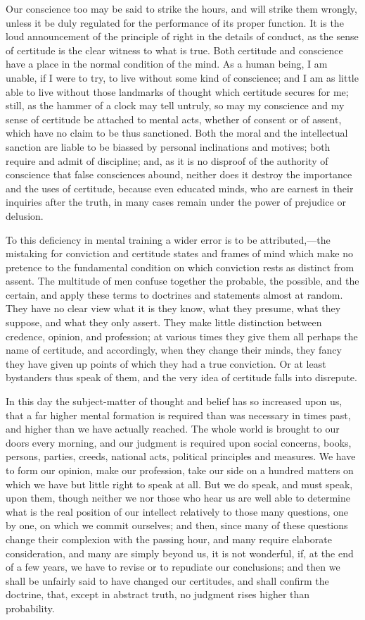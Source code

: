 Our conscience too may be said to strike the hours, and will strike
them wrongly, unless it be duly regulated for the performance of its
proper function. It is the loud announcement of the principle of right
in the details of conduct, as the sense of certitude is the clear
witness to what is true. Both certitude and conscience have a
place in the normal condition of the mind. As a human being, I am
unable, if I were to try, to live without some kind of conscience; and
I am as little able to live without those landmarks of thought which
certitude secures for me; still, as the hammer of a clock may tell
untruly, so may my conscience and my sense of certitude be attached to
mental acts, whether of consent or of assent, which have no claim to
be thus sanctioned. Both the moral and the intellectual sanction are
liable to be biassed by personal inclinations and motives; both
require and admit of discipline; and, as it is no disproof of the
authority of conscience that false consciences abound, neither does it
destroy the importance and the uses of certitude, because even
educated minds, who are earnest in their inquiries after the truth, in
many cases remain under the power of prejudice or delusion.

To this deficiency in mental training a wider error is to be
attributed,—the mistaking for conviction and certitude states and
frames of mind which make no pretence to the fundamental condition on
which conviction rests as distinct from assent. The multitude of men
confuse together the probable, the possible, and the certain, and
apply these terms to doctrines and statements almost at random. They
have no clear view what it is they know, what they presume, what they
suppose, and what they only assert. They make little distinction
between credence, opinion, and profession; at various times they give
them all perhaps the name of certitude, and accordingly, when they
change their minds, they fancy they have given up points of which they had a true conviction. Or at least bystanders thus speak of
them, and the very idea of certitude falls into disrepute.

In this day the subject-matter of thought and belief has so
increased upon us, that a far higher mental formation is required than
was necessary in times past, and higher than we have actually reached.
The whole world is brought to our doors every morning, and our
judgment is required upon social concerns, books, persons, parties,
creeds, national acts, political principles and measures. We have to
form our opinion, make our profession, take our side on a hundred
matters on which we have but little right to speak at all. But we do
speak, and must speak, upon them, though neither we nor those who hear
us are well able to determine what is the real position of our
intellect relatively to those many questions, one by one, on which we
commit ourselves; and then, since many of these questions change their
complexion with the passing hour, and many require elaborate
consideration, and many are simply beyond us, it is not wonderful, if,
at the end of a few years, we have to revise or to repudiate our
conclusions; and then we shall be unfairly said to have changed our
certitudes, and shall confirm the doctrine, that, except in abstract
truth, no judgment rises higher than probability.

